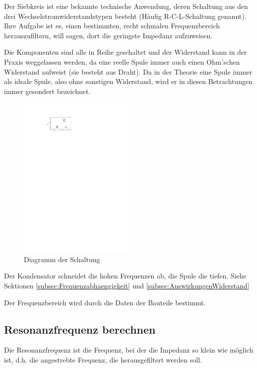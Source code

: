 
Der Siebkreis ist eine bekannte technische Anwendung, deren Schaltung aus den drei Wechselstromwiderstandstypen besteht (Häufig R-C-L-Schaltung genannt).
Ihre Aufgabe ist es, einen bestimmten, recht schmalen Frequenzbereich \glqq herauszufiltern\grqq , will sagen, dort die geringste Impedanz aufzuweisen.

Die Komponenten sind alle in Reihe geschaltet und der Widerstand kann in der Praxis weggelassen werden, da eine reelle Spule immer auch einen Ohm'schen Widerstand aufweist (sie besteht aus Draht). Da in der Theorie eine Spule immer als ideale Spule, also ohne sonstigen Widerstand, wird er in diesen Betrachtungen immer gesondert bezeichnet.

\begin{figure}[h!]
	\centering
	\includegraphics[width=0.5\textwidth]{Pictures/Siebkreis}
	\caption{Diagramm der Schaltung}
\end{figure}

Der Kondensator \glqq schneidet\grqq{} die hohen Frequenzen \glqq ab\grqq , die Spule die tiefen. Siehe Sektionen \ref{subsec:Frequenzabhaengigkeit} und \ref{subsec:AuswirkungenWiderstand}

Der Frequenzbereich wird durch die Daten der Bauteile bestimmt. 

\subsection{Resonanzfrequenz berechnen}

Die Resonanzfrequenz ist die Frequenz, bei der die Impedanz so klein wie möglich ist, d.h. die angestrebte Frequenz, die herausgefiltert werden soll.

